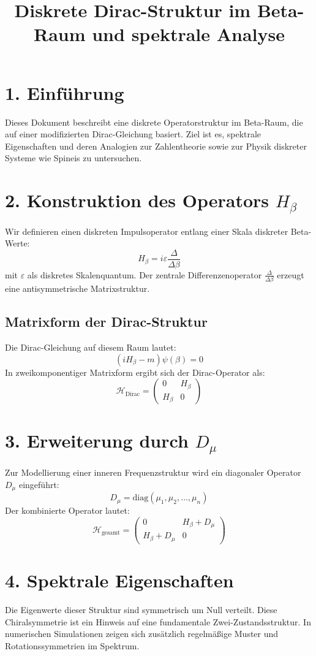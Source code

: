 \documentclass[11pt]{article}
\title{Diskrete Dirac-Struktur im Beta-Raum und spektrale Analyse}
\author{}
\date{}
\begin{document}
\maketitle

\section*{1. Einführung}
Dieses Dokument beschreibt eine diskrete Operatorstruktur im Beta-Raum, die auf einer modifizierten Dirac-Gleichung basiert. Ziel ist es, spektrale Eigenschaften und deren Analogien zur Zahlentheorie sowie zur Physik diskreter Systeme wie Spineis zu untersuchen.

\section*{2. Konstruktion des Operators $H_\beta$}
Wir definieren einen diskreten Impulsoperator entlang einer Skala diskreter Beta-Werte:
\[
H_\beta = i\varepsilon \frac{\Delta}{\Delta \beta}
\]
mit $\varepsilon$ als diskretes Skalenquantum. Der zentrale Differenzenoperator $\frac{\Delta}{\Delta \beta}$ erzeugt eine antisymmetrische Matrixstruktur.

\subsection*{Matrixform der Dirac-Struktur}
Die Dirac-Gleichung auf diesem Raum lautet:
\[
(i H_\beta - m) \psi(\beta) = 0
\]
In zweikomponentiger Matrixform ergibt sich der Dirac-Operator als:
\[
\mathcal{H}_{\text{Dirac}} =
\begin{pmatrix}
0 & H_\beta \\
H_\beta & 0
\end{pmatrix}
\]

\section*{3. Erweiterung durch $D_\mu$}
Zur Modellierung einer inneren Frequenzstruktur wird ein diagonaler Operator $D_\mu$ eingeführt:
\[
D_\mu = \text{diag}(\mu_1, \mu_2, \dots, \mu_n)
\]
Der kombinierte Operator lautet:
\[
\mathcal{H}_{\text{gesamt}} =
\begin{pmatrix}
0 & H_\beta + D_\mu \\
H_\beta + D_\mu & 0
\end{pmatrix}
\]

\section*{4. Spektrale Eigenschaften}
Die Eigenwerte dieser Struktur sind symmetrisch um Null verteilt. Diese Chiralsymmetrie ist ein Hinweis auf eine fundamentale Zwei-Zustandsstruktur. In numerischen Simulationen zeigen sich zusätzlich regelmäßige Muster und Rotationssymmetrien im Spektrum.
\end{document}
